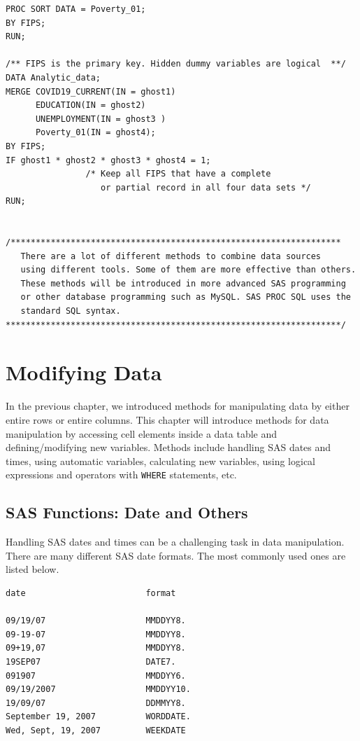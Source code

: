 \documentclass[
]{book}
\begin{document}
\begin{verbatim}
PROC SORT DATA = Poverty_01;
BY FIPS;
RUN;

/** FIPS is the primary key. Hidden dummy variables are logical  **/
DATA Analytic_data;
MERGE COVID19_CURRENT(IN = ghost1)
      EDUCATION(IN = ghost2)
      UNEMPLOYMENT(IN = ghost3 )
      Poverty_01(IN = ghost4);
BY FIPS;
IF ghost1 * ghost2 * ghost3 * ghost4 = 1;  
                /* Keep all FIPS that have a complete 
                   or partial record in all four data sets */
RUN;


/******************************************************************
   There are a lot of different methods to combine data sources
   using different tools. Some of them are more effective than others.
   These methods will be introduced in more advanced SAS programming
   or other database programming such as MySQL. SAS PROC SQL uses the
   standard SQL syntax.
*******************************************************************/
\end{verbatim}

\hypertarget{modifying-data}{%
\chapter{Modifying Data}\label{modifying-data}}

In the previous chapter, we introduced methods for manipulating data by either entire rows or entire columns. This chapter will introduce methods for data manipulation by accessing cell elements inside a data table and defining/modifying new variables. Methods include handling SAS dates and times, using automatic variables, calculating new variables, using logical expressions and operators with \texttt{WHERE} statements, etc.

\hypertarget{sas-functions-date-and-others}{%
\section{SAS Functions: Date and Others}\label{sas-functions-date-and-others}}

Handling SAS dates and times can be a challenging task in data manipulation. There are many different SAS date formats. The most commonly used ones are listed below.

\begin{verbatim}
date                        format

09/19/07                    MMDDYY8.
09-19-07                    MMDDYY8.
09+19,07                    MMDDYY8.
19SEP07                     DATE7.
091907                      MMDDYY6.
09/19/2007                  MMDDYY10.
19/09/07                    DDMMYY8.
September 19, 2007          WORDDATE.
Wed, Sept, 19, 2007         WEEKDATE
\end{verbatim}
\end{document}
